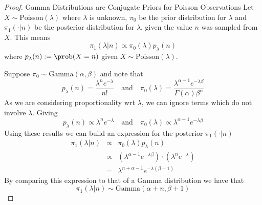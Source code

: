 \documentclass[11pt,a4paper]{article}
\begin{document}
  \begin{proof}{Gamma Distributions are Conjugate Priors for Poisson Observations}
    Let $X\sim\text{Poisson}(\lambda)$ where $\lambda$ is unknown, $\pi_0$ be the prior distribution for $\lambda$ and $\pi_1(\cdot|n)$ be the posterior distribution for $\lambda$, given the value $n$ was sampled from $X$. This means
    \[ \pi_1(\lambda|n)\propto\pi_0(\lambda)p_\lambda(n) \]
    where $p_\lambda(n):=\prob(X=n)$ given $X\sim\text{Poisson}(\lambda)$.
    \par Suppose $\pi_0\sim\text{Gamma}(\alpha,\beta)$ and note that
    \[ p_\lambda(n)=\frac{\lambda^ne^{-\lambda}}{n!}\quad\text{and}\quad \pi_0(\lambda)=\frac{\lambda^{\alpha-1}e^{-\lambda\beta}}{\Gamma(\alpha)\beta^\alpha} \]
    As we are considering proportionality wrt $\lambda$, we can ignore terms which do not involve $\lambda$. Giving
    \[ p_\lambda(n)\propto\lambda^ne^{-\lambda}\quad\text{and}\quad \pi_0(\lambda)\propto\lambda^{\alpha-1}e^{-\lambda\beta} \]
    Using these results we can build an expression for the posterior $\pi_1(\cdot|n)$
    \[\begin{array}{rcl}
        \pi_1(\lambda|n)&\propto&\pi_0(\lambda)p_\lambda(n)\\
        &\propto&\left(\lambda^{\alpha-1}e^{-\lambda\beta}\right)\cdot\left(\lambda^ne^{-\lambda}\right)\\
        &=&\lambda^{n+\alpha-1}e^{-\lambda(\beta+1)}
    \end{array}\]
    By comparing this expression to that of a Gamma distribution we have that
    \[ \pi_1(\lambda|n)\sim\text{Gamma}(\alpha+n,\beta+1) \]
    \proved
  \end{proof}
\end{document}
